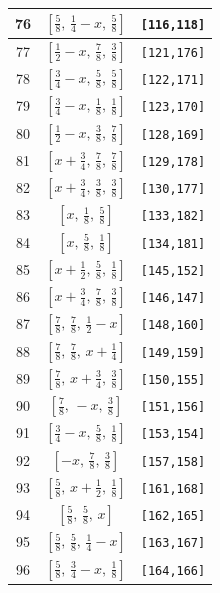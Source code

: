\documentclass[fleqn,8pt]{jsarticle}
\begin{document}
\begin{longtable}{ccc}
76 & $\left[ \frac{5}{8},\, \frac{1}{4} - x,\, \frac{5}{8} \right]$ & {\tt [116,118]} \\ \hline
77 & $\left[ \frac{1}{2} - x,\, \frac{7}{8},\, \frac{3}{8} \right]$ & {\tt [121,176]} \\ \hline
78 & $\left[ \frac{3}{4} - x,\, \frac{5}{8},\, \frac{5}{8} \right]$ & {\tt [122,171]} \\ \hline
79 & $\left[ \frac{3}{4} - x,\, \frac{1}{8},\, \frac{1}{8} \right]$ & {\tt [123,170]} \\ \hline
80 & $\left[ \frac{1}{2} - x,\, \frac{3}{8},\, \frac{7}{8} \right]$ & {\tt [128,169]} \\ \hline
81 & $\left[ x + \frac{3}{4},\, \frac{7}{8},\, \frac{7}{8} \right]$ & {\tt [129,178]} \\ \hline
82 & $\left[ x + \frac{3}{4},\, \frac{3}{8},\, \frac{3}{8} \right]$ & {\tt [130,177]} \\ \hline
83 & $\left[ x,\, \frac{1}{8},\, \frac{5}{8} \right]$ & {\tt [133,182]} \\ \hline
84 & $\left[ x,\, \frac{5}{8},\, \frac{1}{8} \right]$ & {\tt [134,181]} \\ \hline
85 & $\left[ x + \frac{1}{2},\, \frac{5}{8},\, \frac{1}{8} \right]$ & {\tt [145,152]} \\ \hline
86 & $\left[ x + \frac{3}{4},\, \frac{7}{8},\, \frac{3}{8} \right]$ & {\tt [146,147]} \\ \hline
87 & $\left[ \frac{7}{8},\, \frac{7}{8},\, \frac{1}{2} - x \right]$ & {\tt [148,160]} \\ \hline
88 & $\left[ \frac{7}{8},\, \frac{7}{8},\, x + \frac{1}{4} \right]$ & {\tt [149,159]} \\ \hline
89 & $\left[ \frac{7}{8},\, x + \frac{3}{4},\, \frac{3}{8} \right]$ & {\tt [150,155]} \\ \hline
90 & $\left[ \frac{7}{8},\, - x,\, \frac{3}{8} \right]$ & {\tt [151,156]} \\ \hline
91 & $\left[ \frac{3}{4} - x,\, \frac{5}{8},\, \frac{1}{8} \right]$ & {\tt [153,154]} \\ \hline
92 & $\left[ - x,\, \frac{7}{8},\, \frac{3}{8} \right]$ & {\tt [157,158]} \\ \hline
93 & $\left[ \frac{5}{8},\, x + \frac{1}{2},\, \frac{1}{8} \right]$ & {\tt [161,168]} \\ \hline
94 & $\left[ \frac{5}{8},\, \frac{5}{8},\, x \right]$ & {\tt [162,165]} \\ \hline
95 & $\left[ \frac{5}{8},\, \frac{5}{8},\, \frac{1}{4} - x \right]$ & {\tt [163,167]} \\ \hline
96 & $\left[ \frac{5}{8},\, \frac{3}{4} - x,\, \frac{1}{8} \right]$ & {\tt [164,166]} \\
\end{longtable}
\end{document}
